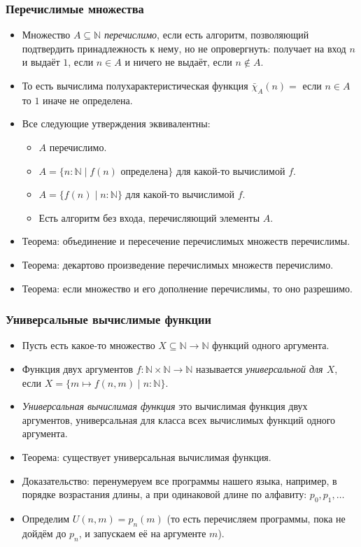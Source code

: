 \documentclass[10pt]{beamer}
\begin{document}
\begin{frame}
    \frametitle{Перечислимые множества}
    \begin{itemize}
        \item Множество $A \subseteq \mathbb{N}$ \emph{перечислимо}, если есть алгоритм, позволяющий подтвердить принадлежность к нему, но не опровергнуть: получает на вход $n$ и выдаёт $1$, если $n \in A$ и ничего не выдаёт, если $n \notin A$.
        \item То есть вычислима полухарактеристическая функция $\bar{\chi}_A(n) = $ если $n \in A$ то $1$ иначе не определена.
        \item Все следующие утверждения эквивалентны:
        \begin{itemize}
            \item $A$ перечислимо.
            \item $A = \{n : \mathbb{N} \mid f(n)$ определена$\}$ для какой-то вычислимой $f$.
            \item $A = \{f(n) \mid n : \mathbb{N}\}$ для какой-то вычислимой $f$.
            \item Есть алгоритм без входа, перечисляющий элементы $A$.
        \end{itemize}
        \item Теорема: объединение и пересечение перечислимых множеств перечислимы.
        \item Теорема: декартово произведение перечислимых множеств перечислимо.
        \item Теорема: если множество и его дополнение перечислимы, то оно разрешимо.
    \end{itemize}
\end{frame}

\begin{frame}
    \frametitle{Универсальные вычислимые функции}
    \begin{itemize}
        \item Пусть есть какое-то множество $X \subseteq \mathbb{N} \to \mathbb{N}$ функций одного аргумента.
        \item Функция двух аргументов $f : \mathbb{N} \times \mathbb{N} \to \mathbb{N}$ называется \emph{универсальной для $X$}, если $X = \{m \mapsto f(n, m) \mid n : \mathbb{N}\}$.
        \item \emph{Универсальная вычислимая функция} это вычислимая функция двух аргументов, универсальная для класса всех вычислимых функций одного аргумента.
        \item Теорема: существует универсальная вычислимая функция.
        \item Доказательство: \pause перенумеруем все программы нашего языка, например, в порядке возрастания длины, а при одинаковой длине по алфавиту: $p_0,p_1,\ldots$ 
        \item Определим $U(n,m) = p_n(m)$ (то есть перечисляем программы, пока не дойдём до $p_n$, и запускаем её на аргументе $m$).
    \end{itemize}
\end{frame}
\end{document}
